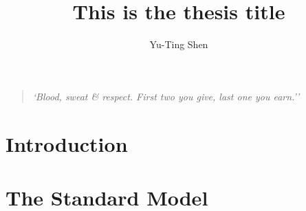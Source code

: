 \documentclass[hyperlinks]{outhesis}
\begin{document}
\author{Yu-Ting Shen}
\title{This is the thesis title}
\address{Norman, Oklahoma}

\begin{dedication}
    \begin{quotation}
        \raggedright{\emph{`Blood, sweat \& respect. First two you give, last one you earn.''}} \\
    \end{quotation}
\end{dedication}

\begin{acknowledgements}
    
\end{acknowledgements}

%   

\frontmatter

\maketitle

\mainmatter

\hypersetup{linkcolor=blue}


\chapter{Introduction}
\label{chapter:introduction}
\graphicspath{{figures/introduction/}}



\chapter{The Standard Model}
\label{chapter:standard_model}
\graphicspath{{figures/standard_model/}}

\end{document}
